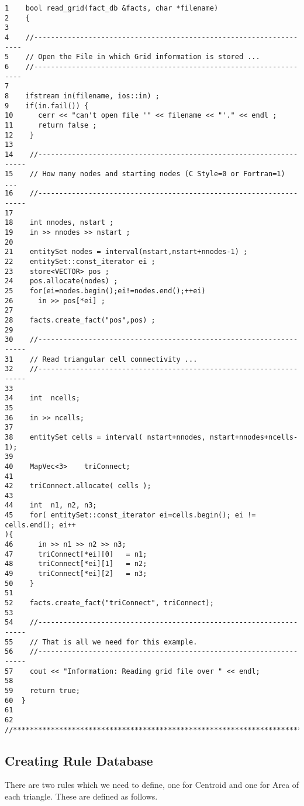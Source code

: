\begin{verbatim}
1    bool read_grid(fact_db &facts, char *filename)
2    {
3
4    //-------------------------------------------------------------------
5    // Open the File in which Grid information is stored ...
6    //-------------------------------------------------------------------
7
8    ifstream in(filename, ios::in) ;
9    if(in.fail()) {
10      cerr << "can't open file '" << filename << "'." << endl ;
11      return false ;
12    }
13
14    //-------------------------------------------------------------------
15    // How many nodes and starting nodes (C Style=0 or Fortran=1) ...
16    //-------------------------------------------------------------------
17
18    int nnodes, nstart ;
19    in >> nnodes >> nstart ;
20
21    entitySet nodes = interval(nstart,nstart+nnodes-1) ;
22    entitySet::const_iterator ei ;
23    store<VECTOR> pos ;
24    pos.allocate(nodes) ;
25    for(ei=nodes.begin();ei!=nodes.end();++ei)
26      in >> pos[*ei] ;
27
28    facts.create_fact("pos",pos) ;
29
30    //-------------------------------------------------------------------
31    // Read triangular cell connectivity ...
32    //-------------------------------------------------------------------
33
34    int  ncells;
35
36    in >> ncells;
37
38    entitySet cells = interval( nstart+nnodes, nstart+nnodes+ncells-1);
39
40    MapVec<3>    triConnect;
41
42    triConnect.allocate( cells );
43
44    int  n1, n2, n3;
45    for( entitySet::const_iterator ei=cells.begin(); ei != cells.end(); ei++
){
46      in >> n1 >> n2 >> n3;
47      triConnect[*ei][0]   = n1;
48      triConnect[*ei][1]   = n2;
49      triConnect[*ei][2]   = n3;
50    }
51
52    facts.create_fact("triConnect", triConnect);
53
54    //-------------------------------------------------------------------
55    // That is all we need for this example.
56    //-------------------------------------------------------------------
57    cout << "Information: Reading grid file over " << endl;
58
59    return true;
60  }
61
62  //*********************************************************************
\end{verbatim}

\subsection { Creating Rule Database }
There are two rules which we need to define, one for Centroid and one
for Area of each triangle. These are defined as follows.

